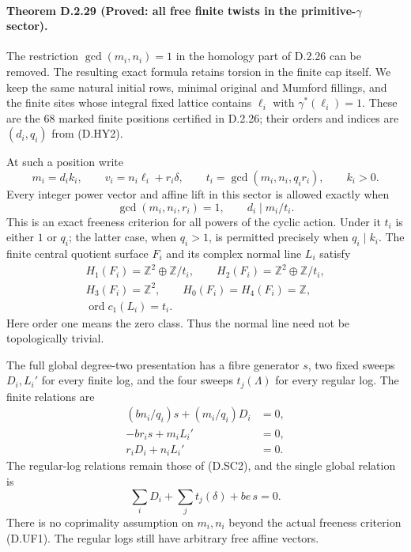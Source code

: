 \paragraph{Theorem D.2.29 (Proved: all free finite twists in the primitive-$\gamma$ sector).}
The restriction $\gcd(m_i,n_i)=1$ in the homology part of D.2.26
can be removed. The resulting exact formula retains torsion in
the finite cap itself. We keep the same natural initial rows,
minimal original and Mumford fillings, and the finite sites
whose integral fixed lattice contains $\ell_i$ with
$\gamma^*(\ell_i)=1$. These are the $68$ marked finite positions
certified in D.2.26; their orders and indices are $(d_i,q_i)$
from (D.HY2).

At such a position write
\[
 m_i=d_i k_i,\qquad v_i=n_i\ell_i+r_i\delta,\qquad
 t_i=\gcd(m_i,n_i,q_i r_i),\qquad k_i>0.
\]
Every integer power vector and affine lift in this sector is
allowed exactly when
\[
 \gcd(m_i,n_i,r_i)=1,\qquad d_i\mid m_i/t_i.                 \tag{D.UF1}
\]
This is an exact freeness criterion for all powers of the
cyclic action. Under it $t_i$ is either $1$ or $q_i$; the latter
case, when $q_i>1$, is permitted precisely when $q_i\mid k_i$.
The finite central quotient surface $F_i$ and its complex
normal line $L_i$ satisfy
\[
\begin{gathered}
 H_1(F_i)=\mathbb Z^2\oplus\mathbb Z/t_i,\qquad
 H_2(F_i)=\mathbb Z^2\oplus\mathbb Z/t_i,\\
 H_3(F_i)=\mathbb Z^2,\qquad H_0(F_i)=H_4(F_i)=\mathbb Z,\\
 \operatorname{ord}c_1(L_i)=t_i.
\end{gathered}                                               \tag{D.UF2}
\]
Here order one means the zero class. Thus the normal line need
not be topologically trivial.

The full global degree-two presentation has a fibre generator
$s$, two fixed sweeps $D_i,L_i'$ for every finite log, and the
four sweeps $t_j(\Lambda)$ for every regular log. The finite
relations are
\[
\begin{aligned}
 (bn_i/q_i)s+(m_i/q_i)D_i&=0,\\
 -br_i s+m_iL_i'&=0,\\
 r_iD_i+n_iL_i'&=0.
\end{aligned}                                                \tag{D.UF3}
\]
The regular-log relations remain those of (D.SC2), and the
single global relation is
\[
 \sum_iD_i+\sum_jt_j(\delta)+be\,s=0.                       \tag{D.UF4}
\]
There is no coprimality assumption on $m_i,n_i$ beyond the
actual freeness criterion (D.UF1). The regular logs still have
arbitrary free affine vectors.

